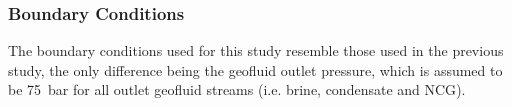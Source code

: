

        

    \subsubsection{Boundary Conditions}
        \label{sec:prosim_NCG_reinj}
        The boundary conditions used for this study resemble those used in the previous study, the only difference being the geofluid outlet pressure, which is assumed to be \qty{75}{\bar} for all outlet geofluid streams (i.e. brine, condensate and \ac{NCG}).

